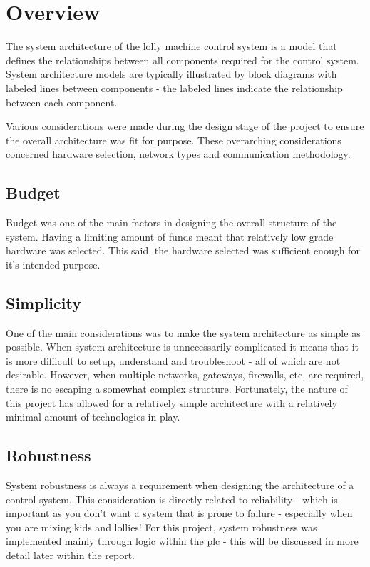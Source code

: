 \section{Overview}
    The system architecture of the lolly machine control system is a model that defines the relationships between all  components required for the control system. System architecture models are typically illustrated by block diagrams with labeled lines between components - the labeled lines indicate the relationship between each component. 

    Various considerations were made during the design stage of the project to ensure the overall architecture was fit for purpose. These overarching considerations concerned hardware selection,  network types and communication methodology.

    \subsection{Budget}
        Budget was one of the main factors in designing the overall structure of the system. Having a limiting amount of funds meant that relatively low grade hardware was selected. This said, the hardware selected was sufficient enough for it’s intended purpose.

    \subsection{Simplicity}
        One of the main considerations was to make the system architecture as simple as possible. When system architecture is unnecessarily complicated it means that it is more difficult to setup, understand and troubleshoot - all of which are not desirable. However, when multiple networks, gateways, firewalls, etc, are required, there is no escaping a somewhat complex structure. Fortunately, the nature of this project has allowed for a relatively simple architecture with a relatively minimal amount of technologies in play.
    
    \subsection{Robustness}
        System robustness is always a requirement when designing the architecture of a control system. This consideration is directly related to reliability - which is important as you don’t want a system that is prone to failure - especially when you are mixing kids and lollies! For this project, system robustness was implemented mainly through logic within the \acrshort{plc} - this will be discussed in more detail later within the report. 
    
